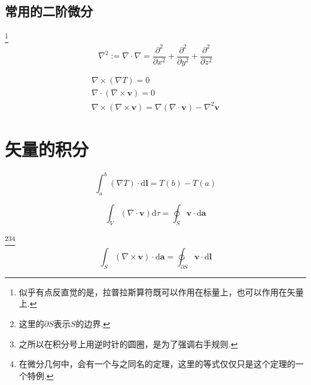 \subsection{常用的二阶微分}

\begin{definition}[拉普拉斯算符]\footnote{似乎有点反直觉的是，拉普拉斯算符既可以作用在标量上，也可以作用在矢量上.}
    \begin{equation}
        \nabla^2 := \nabla \cdot \nabla = \frac{\partial ^2}{\partial x^2}+\frac{\partial ^2}{\partial y^2}+\frac{\partial ^2}{\partial z^2}
    \end{equation}
\end{definition}

\begin{theorem}
    \begin{gather}
        \nabla \times \left( \nabla T \right) =0\\
        \nabla \cdot \left( \nabla \times \mathbf{v} \right) =0\\
        \nabla \times \left( \nabla \times \mathbf{v} \right) =\nabla \left( \nabla \cdot \mathbf{v} \right) -\nabla ^2\mathbf{v}
    \end{gather}
\end{theorem}


\section{矢量的积分}\label{sec:integrationOfVector}

\begin{theorem}[梯度定理]
    \begin{equation}
        \int_a^b{\left( \nabla T \right) \cdot \mathrm{d}\mathbf{l}}=T\left( b \right) -T\left( a \right) 
    \end{equation}
\end{theorem}

\begin{theorem}[散度定理]
    \begin{equation}
        \int_V{\left( \nabla \cdot \mathbf{v} \right) \mathrm{d}\tau}=\oint_S{\mathbf{v}\cdot \mathrm{d}\mathbf{a}} \label{eq:Div}
    \end{equation}
\end{theorem}

\begin{theorem}\footnote{这里的$\partial S$表示$S$的边界.}\footnote{之所以在积分号上用逆时针的圆圈，是为了强调右手规则.}\footnote{在微分几何中，会有一个与之同名的定理，这里的等式仅仅只是这个定理的一个特例.}
    \begin{equation}
        \int_S{\left( \nabla \times \mathbf{v} \right) \cdot \mathrm{d}\mathbf{a}}=\ointctrclockwise_{\partial S}{\mathbf{v}\cdot \mathrm{d}\mathbf{l}}\label{eq:Curl}
    \end{equation}
\end{theorem}

